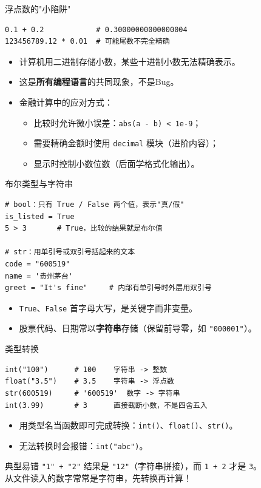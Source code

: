 \documentclass[9pt]{ctexbeamer}
\begin{document}
\begin{frame}[fragile]{浮点数的"小陷阱"}
	\begin{lstlisting}
0.1 + 0.2            # 0.30000000000000004
123456789.12 * 0.01  # 可能尾数不完全精确
\end{lstlisting}
	\begin{itemize}
		\item 计算机用二进制存储小数，某些十进制小数无法精确表示。
		\item 这是\textbf{所有编程语言}的共同现象，不是Bug。
		\item 金融计算中的应对方式：
		\begin{itemize}
			\item 比较时允许微小误差：\texttt{abs(a - b) < 1e-9}；
			\item 需要精确金额时使用 \texttt{decimal} 模块（进阶内容）；
			\item 显示时控制小数位数（后面学格式化输出）。
		\end{itemize}
	\end{itemize}
\end{frame}

\begin{frame}[fragile]{布尔类型与字符串}
	\begin{lstlisting}
# bool：只有 True / False 两个值，表示"真/假"
is_listed = True
5 > 3       # True，比较的结果就是布尔值

# str：用单引号或双引号括起来的文本
code = "600519"
name = '贵州茅台'
greet = "It's fine"     # 内部有单引号时外层用双引号
\end{lstlisting}
	\begin{itemize}
		\item \texttt{True}、\texttt{False} 首字母大写，是关键字而非变量。
		\item 股票代码、日期常以\textbf{字符串}存储（保留前导零，如 \texttt{"000001"}）。
	\end{itemize}
\end{frame}

\begin{frame}[fragile]{类型转换}
	\begin{lstlisting}
int("100")      # 100    字符串 -> 整数
float("3.5")    # 3.5    字符串 -> 浮点数
str(600519)     # '600519'  数字 -> 字符串
int(3.99)       # 3      直接截断小数，不是四舍五入
\end{lstlisting}
	\begin{itemize}
		\item 用类型名当函数即可完成转换：\texttt{int()}、\texttt{float()}、\texttt{str()}。
		\item 无法转换时会报错：\texttt{int("abc")}。
	\end{itemize}
	\begin{alertblock}{典型易错}
		\texttt{"1" + "2"} 结果是 \texttt{"12"}（字符串拼接），而 \texttt{1 + 2} 才是 \texttt{3}。\\
		从文件读入的数字常常是字符串，先转换再计算！
	\end{alertblock}
\end{frame}
\end{document}
